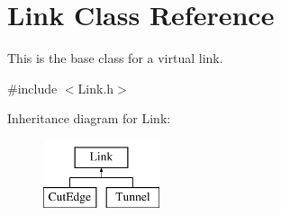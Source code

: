 \hypertarget{classLink}{\section{\-Link \-Class \-Reference}
\label{classLink}
}


\-This is the base class for a virtual link.  




{\ttfamily \#include $<$\-Link.\-h$>$}

\-Inheritance diagram for \-Link\-:\begin{figure}[H]
\begin{center}
\leavevmode
\includegraphics[height=2.000000cm]{classLink}
\end{center}
\end{figure}

